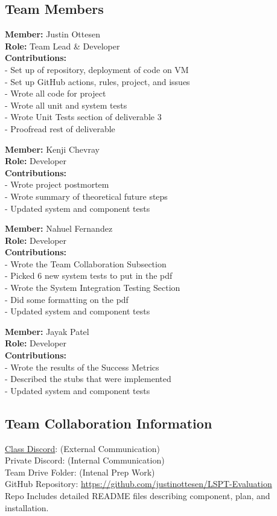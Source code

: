 \subsection*{Team Members}

\textbf{Member:} Justin Ottesen \\
\smallskip\textbf{Role:} Team Lead \& Developer \\
\smallskip\textbf{Contributions:}
\\- Set up of repository, deployment of code on VM
\\- Set up GitHub actions, rules, project, and issues
\\- Wrote all code for project
\\- Wrote all unit and system tests
\\- Wrote Unit Tests section of deliverable 3
\\- Proofread rest of deliverable

\smallskip\textbf{Member:} Kenji Chevray \\
\smallskip\textbf{Role:} Developer \\
\smallskip\textbf{Contributions:}
\\- Wrote project postmortem
\\- Wrote summary of theoretical future steps
\\- Updated system and component tests


\smallskip\textbf{Member:} Nahuel Fernandez \\
\smallskip\textbf{Role:} Developer \\
\smallskip\textbf{Contributions:}
\\- Wrote the Team Collaboration Subsection
\\- Picked 6 new system tests to put in the pdf
\\- Wrote the System Integration Testing Section
\\- Did some formatting on the pdf 
\\- Updated system and component tests

\smallskip\textbf{Member:} Jayak Patel \\
\smallskip\textbf{Role:} Developer \\
\smallskip\textbf{Contributions:}
\\- Wrote the results of the Success Metrics
\\- Described the stubs that were implemented
\\- Updated system and component tests

\subsection*{Team Collaboration Information}
\href{https://discord.gg/pMyXUx2X}{Class Discord}: (External Communication)
\\Private Discord: (Internal Communication)
\\Team Drive Folder: (Intenal Prep Work)
\\GitHub Repository: \url{https://github.com/justinottesen/LSPT-Evaluation} 
\\Repo Includes detailed README files describing component, plan, and installation.

